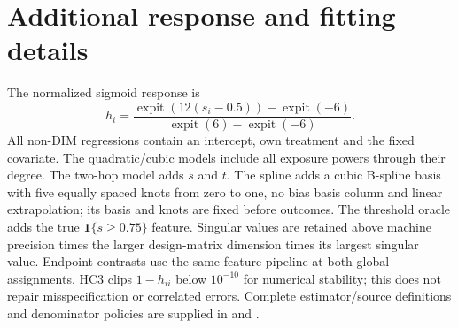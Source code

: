 \section{Additional response and fitting details}
\label{app:simulation-details}
The normalized sigmoid response is
\[
 h_i=\frac{\operatorname{expit}(12(s_i-0.5))-\operatorname{expit}(-6)}{\operatorname{expit}(6)-\operatorname{expit}(-6)}.
\]
All non-DIM regressions contain an intercept, own treatment and the fixed covariate. The quadratic/cubic models include all exposure powers through their degree. The two-hop model adds $s$ and $t$. The spline adds a cubic B-spline basis with five equally spaced knots from zero to one, no bias basis column and linear extrapolation; its basis and knots are fixed before outcomes. The threshold oracle adds the true $\mathbf1\{s\geq0.75\}$ feature. Singular values are retained above machine precision times the larger design-matrix dimension times its largest singular value. Endpoint contrasts use the same feature pipeline at both global assignments. HC3 clips $1-h_{ii}$ below $10^{-10}$ for numerical stability; this does not repair misspecification or correlated errors. Complete estimator/source definitions and denominator policies are supplied in  and .
